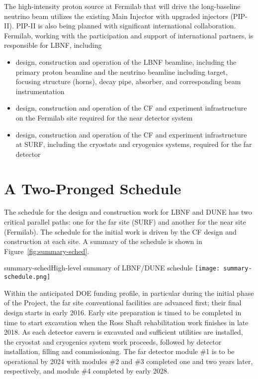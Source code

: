 The high-intensity proton source at Fermilab that will drive the long-baseline neutrino beam utilizes the existing 
Main Injector with upgraded injectors (PIP-II).  PIP-II is also being planned with significant international collaboration.  Fermilab, working with the participation and support of international partners, is responsible for 
LBNF, including
\begin{itemize}
\item design, construction and operation of the LBNF beamline, including the primary proton beamline and the neutrino beamline including target, focusing structure (horns), decay pipe, absorber, and corresponding beam instrumentation
\item design, construction and operation of the CF and 
experiment infrastructure on the Fermilab site required for the near detector system
\item design, construction and operation of the CF and 
experiment infrastructure 
at SURF, including the cryostats and cryogenics systems, required for the far detector
\end{itemize}


\section{A Two-Pronged Schedule} 

The schedule for the design and construction work for LBNF and DUNE has two critical parallel paths: one for the 
far site (SURF) and another for the near site (Fermilab). The schedule for the initial work is driven by the CF design and construction at each site. A summary of the schedule is shown in Figure~\ref{fig:summary-sched}.

\begin{cdrfigure}{summary-sched}{High-level summary of LBNF/DUNE schedule}
\texttt{[image: summary-schedule.png]}
\end{cdrfigure}


Within the anticipated DOE funding profile, in particular during the initial phase of the Project, the far site conventional
facilities are advanced first; their final design starts in early 2016. Early site preparation is timed to be completed 
in time to start excavation when the Ross Shaft rehabilitation work finishes
 in late 2018.   As each detector 
 cavern is excavated and sufficient utilities are installed, the cryostat and cryogenics system work proceeds, followed by detector installation, filling and commissioning. 
 The far detector module \#1 is to be operational by 2024  with modules \#2 and \#3 completed
 one and two years later, respectively, and module \#4 completed by early 2028.  

